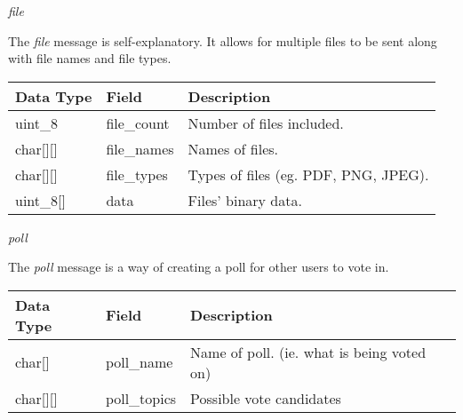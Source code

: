 \documentclass{article}
\begin{document}
\begin{center}
    \large \textit{file}
\end{center}
The \textit{file} message is self-explanatory. It allows for multiple files to be sent along with file names and file types.
\begin{table}[H]
\centering
\begin{tabular}{|p{1.3cm}|p{2.5cm}|p{5.5cm}|}
\hline
\rowcolor{tblgrey} 
Data Type       & Field           & Description                                              \\ \hline
uint\_8         & file\_count     & Number of files included.                                 \\ \hline
char[\hspace{0.05cm}][\hspace{0.05cm}] & file\_names     & Names of files.                                           \\ \hline
char[\hspace{0.05cm}][\hspace{0.05cm}] & file\_types     & Types of files (eg. PDF, PNG, JPEG).                      \\ \hline
uint\_8[\hspace{0.05cm}]         & data            & Files' binary data.                                       \\ \hline
\end{tabular}
\end{table}

\newpage

\begin{center}
    \large{\textit{poll}}
\end{center}
The \textit{poll} message is a way of creating a poll for other users to vote in.
\begin{table}[H]
\centering
\begin{tabular}{|p{1.3cm}|p{2.5cm}|p{5.5cm}|}
\hline
\rowcolor{tblgrey} 
Data Type   & Field           & Description                                               \\ \hline
char[\hspace{0.05cm}] & poll\_name      & Name of poll. (ie. what is being voted on)                \\ \hline
char[\hspace{0.05cm}][\hspace{0.05cm}] & poll\_topics    & Possible vote candidates                                  \\ \hline
\end{tabular}
\end{table}
\end{document}
